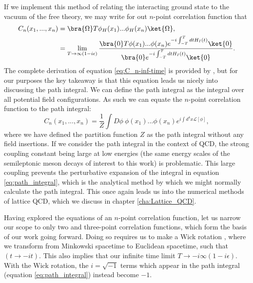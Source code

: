 If we implement this method of relating the interacting ground state to the vacuum of the free theory, we may write for out $n$-point correlation function that
\begin{equation}\label{eq:C_n-inf-time}
    \begin{split}
         C_n(x_1,...,x_n) &= \bra{\Omega}T{\phi_H}(x_1)...\phi_H(x_n)\ket{\Omega},\\
         &=\lim_{T\rightarrow\infty(1-i\epsilon)} \frac{\bra{0}T{\phi}(x_1)...\phi(x_n)e^{-i\int^T_{-T}dtH_I(t)}\ket{0}}{\bra{0}e^{-i\int^T_{-T}dtH_I(t)}\ket{0}}.
    \end{split}
\end{equation}
The complete derivation of equation \ref{eq:C_n-inf-time} is provided by \cite{peskin1995qft}, but for our purposes the key takeaway is that this equation leads us nicely into discussing the path integral.  We can define the path integral as the integral over all potential field configurations.  As such we can equate  the $n$-point correlation function to the path integral:
\begin{equation}\label{eq:path_integral}
    C_n(x_1,...,x_n) = \frac{1}{{Z}}\int D\phi \ {\phi}(x_1)...\phi(x_n) e^{i\int d^4x \mathcal{L}[\phi]},
\end{equation}
where we have defined the partition function ${Z}$ as the path integral without any field insertions.  If we consider the path integral in the context of QCD, the strong coupling constant being large at low energies (the same energy scales of the semileptonic meson decays of interest to this work) is problematic. This large coupling prevents the perturbative expansion of the integral in equation \ref{eq:path_integral}, which is the analytical method by which we might normally calculate the path integral.  This once again leads us into the numerical methods of lattice QCD, which we discuss in chapter \ref{cha:Lattice_QCD}.

Having explored the equations of an $n$-point correlation function, let us narrow our scope to only two and three-point correlation functions, which form the basis of our work going forward. Doing so requires us to make a Wick rotation \cite{PhysRev.96.1124}, where we transform from Minkowski spacetime to Euclidean spacetime, such that $(t\rightarrow-it)$.  This also implies that our infinite time limit $T\rightarrow-i\infty(1-i\epsilon)$.  With the Wick rotation, the $i=\sqrt{-1}$ terms which appear in the path integral (equation \ref{eq:path_integral}) instead become $-1$.

